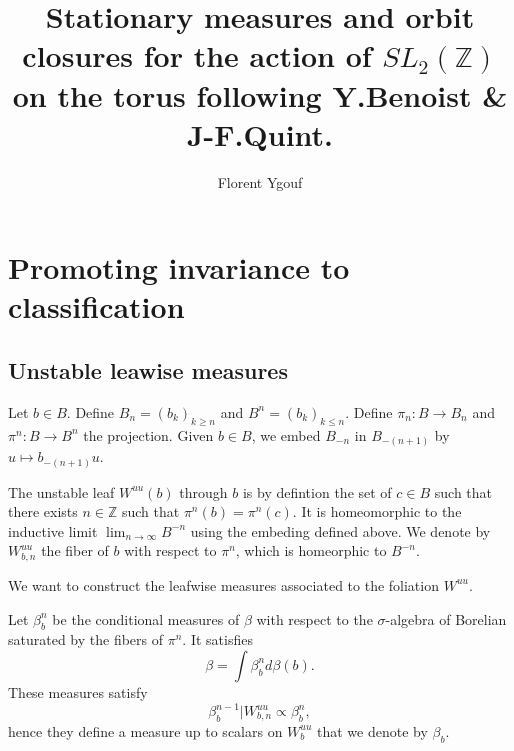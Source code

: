 \documentclass[11pt]{article}
\title{Stationary measures and orbit closures for the action of $SL_2(\mathbb{Z})$ on the torus following Y.Benoist \& J-F.Quint.}
\author{Florent Ygouf}
\newcommand{\Z}{\mathbb{Z}}
\begin{document}
 
\maketitle

\section{Promoting invariance to classification}
\label{sec:promoting_invariance_to_classification}

\subsection{Unstable leawise measures}
\label{sub:unstable_leawise_measures}

Let $ b \in B $.
Define
$ B_{n} = (b_{k})_{k\ge n}  $
and
$ B^{n} = (b_{k})_{k \le n}  $.
Define
$ \pi_{n} : B \to B_{n} $
and
$ \pi^{n} : B \to B^{n} $
the projection.
Given $ b \in B $,
we embed
$ B_{-n} $
in
$ B_{-(n+1)} $
by
$ u \mapsto b_{-(n+1)} u $.

The unstable leaf
$ W^{uu}(b) $ 
through $ b $ is
by 
defintion
the set of $ c \in B $
such that there exists
$ n \in \Z $
such that
$ \pi^{n} (b) = \pi^{n} (c) $.
It is homeomorphic to the
inductive limit
$ \lim_{n \to \infty}  B^{-n} $
using the embeding defined above.
We denote by
$ W^{uu}_{b,n} $
the fiber of $ b $
with respect to
$ \pi^{n} $,
which is homeorphic to $ B^{-n} $.


We want to
construct the leafwise measures
associated to the foliation
$ W^{uu} $.

Let
$ \beta_{b}^{n} $ 
be the conditional measures
of $ \beta $
with respect to the
$ \sigma $-algebra of Borelian
saturated by the fibers of
$ \pi^{n} $.
It satisfies
\begin{equation}
	\beta
	=
	\int
	\beta_{b}^{n} 
	d\beta(b).
\end{equation}
These measures satisfy
\begin{equation}
	\beta_{b}^{n-1}{| W^{uu}_{b, n} } 
	\propto
	\beta_{b}^{n}
	,
\end{equation}
hence they define a measure up to scalars
on
$ W^{uu}_{b} $
that we denote by $ \beta_{b} $.
\end{document}
